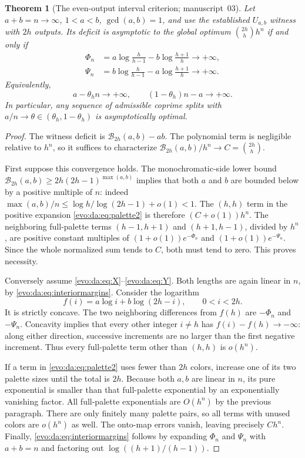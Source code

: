 \documentclass[11pt,a4paper]{article}
\numberwithin{equation}{section}
\newtheorem{theorem}{Theorem}[section]
\theoremstyle{definition}
\theoremstyle{remark}
\newcommand{\Bip}{\mathcal B}
\begin{document}
\begin{theorem}[The even-output interval criterion; manuscript~03]\label{evo:da:thm:plateau}
Let $a+b=n\to\infty$, $1<a<b$, $\gcd(a,b)=1$, and use the established
$U_{a,b}$ witness with $2h$ outputs. Its deficit is asymptotic to the global
optimum $\binom{2h}{h}h^n$ if and only if
\begin{align}
\Phi_n&=a\log\frac h{h-1}-b\log\frac{h+1}h\longrightarrow+\infty,
\label{evo:da:eq:X}\\
\Psi_n&=b\log\frac h{h-1}-a\log\frac{h+1}h\longrightarrow+\infty.
\label{evo:da:eq:Y}
\end{align}
Equivalently,
\begin{equation}\label{evo:da:eq:interiormargins}
 a-\theta_hn\longrightarrow+\infty,
 \qquad (1-\theta_h)n-a\longrightarrow+\infty.
\end{equation}
In particular, any sequence of admissible coprime splits with
$a/n\to\theta\in(\theta_h,1-\theta_h)$ is asymptotically optimal.
\end{theorem}
\begin{proof}
The witness deficit is $\Bip_{2h}(a,b)-ab$. The polynomial term is negligible
relative to $h^n$, so it suffices to characterize
$\Bip_{2h}(a,b)/h^n\to C=\binom{2h}{h}$.

First suppose this convergence holds. The monochromatic-side lower bound
$\Bip_{2h}(a,b)\ge2h(2h-1)^{\max(a,b)}$ implies that both $a$ and $b$ are
bounded below by a positive multiple of $n$: indeed
$\max(a,b)/n\le\log h/\log(2h-1)+o(1)<1$. The $(h,h)$ term in the positive
expansion \eqref{evo:da:eq:palette2} is therefore $(C+o(1))h^n$. The
neighboring full-palette terms $(h-1,h+1)$ and $(h+1,h-1)$, divided by $h^n$,
are positive constant multiples of $(1+o(1))e^{-\Phi_n}$ and
$(1+o(1))e^{-\Psi_n}$. Since the whole normalized sum tends to $C$, both must
tend to zero. This proves necessity.

Conversely assume \eqref{evo:da:eq:X}--\eqref{evo:da:eq:Y}. Both lengths are
again linear in $n$, by \eqref{evo:da:eq:interiormargins}. Consider the
logarithm
\[
 f(i)=a\log i+b\log(2h-i),\qquad 0<i<2h.
\]
It is strictly concave. The two neighboring differences from $f(h)$ are
$-\Phi_n$ and $-\Psi_n$. Concavity implies that every other integer $i\ne h$
has $f(i)-f(h)\to-\infty$: along either direction, successive increments are
no larger than the first negative increment. Thus every full-palette term
other than $(h,h)$ is $o(h^n)$.

If a term in \eqref{evo:da:eq:palette2} uses fewer than $2h$ colors, increase
one of its two palette sizes until the total is $2h$. Because both $a,b$ are
linear in $n$, its pure exponential is smaller than that full-palette
exponential by an exponentially vanishing factor. All full-palette
exponentials are $O(h^n)$ by the previous paragraph. There are only finitely
many palette pairs, so all terms with unused colors are $o(h^n)$ as well. The
onto-map errors vanish, leaving precisely $Ch^n$. Finally,
\eqref{evo:da:eq:interiormargins} follows by expanding $\Phi_n$ and $\Psi_n$
with $a+b=n$ and factoring out $\log((h+1)/(h-1))$.
\end{proof}
\end{document}
